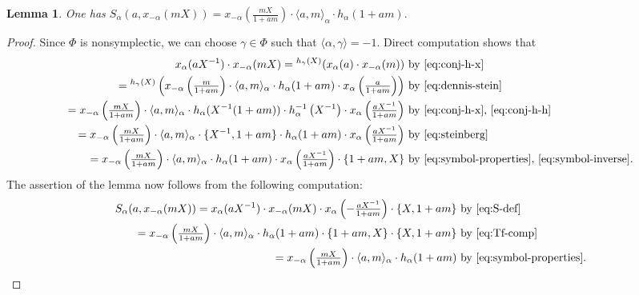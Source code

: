 \documentclass[oneside, 8pt]{amsart}
\newtheorem{lemma}{Lemma}
\theoremstyle{remark}
\theoremstyle{definition}
\numberwithin{lemma}{section}
\numberwithin{prop}{section}
\numberwithin{corollary}{section}
\numberwithin{externaltheorem}{section}
\numberwithin{equation}{section}
\begin{document}
\begin{lemma} \label{lem:Tulenbaev-formula} 
One has $S_\alpha(a, x_{-\alpha}(mX)) = x_{-\alpha}\left(\tfrac{mX}{1+am}\right) \cdot \langle a, m\rangle_\alpha \cdot h_\alpha(1+am).$
\end{lemma}
\begin{proof} Since $\Phi$ is nonsymplectic, we can choose $\gamma \in \Phi$ such that $\langle \alpha, \gamma \rangle = -1$. Direct computation shows that
 \begin{align} 
 x_\alpha(aX^{-1}) \cdot x_{-\alpha}(mX) = {}^{h_\gamma(X)}(x_\alpha(a) \cdot x_{-\alpha}(m)) &\text{ by~\eqref{eq:conj-h-x}} \label{eq:Tf-comp} \\
 = {}^{h_\gamma(X)}\left( x_{-\alpha}\left(\tfrac{m}{1+am}\right) \cdot \langle a, m\rangle_\alpha \cdot h_\alpha(1+am) \cdot x_\alpha\left(\tfrac{a}{1+am}\right) \right) &\text{ by~\eqref{eq:dennis-stein}} \nonumber \\
 = x_{-\alpha}\left(\tfrac{mX}{1+am}\right) \cdot \langle a, m\rangle_\alpha \cdot h_\alpha(X^{-1}(1+am))\cdot h_\alpha^{-1}\left(X^{-1}\right) \cdot x_{\alpha}\left(\tfrac{aX^{-1}}{1+am}\right) &\text{ by~\eqref{eq:conj-h-x}, \eqref{eq:conj-h-h}} \nonumber \\
 = x_{-\alpha}\left(\tfrac{mX}{1+am}\right) \cdot \langle a, m\rangle_\alpha \cdot \{X^{-1}, 1+am\} \cdot h_\alpha(1+am)\cdot x_{\alpha}\left(\tfrac{aX^{-1}}{1+am}\right)&\text{ by~\eqref{eq:steinberg}} \nonumber \\
 = x_{-\alpha}\left(\tfrac{mX}{1+am}\right) \cdot \langle a, m\rangle_\alpha \cdot h_\alpha(1+am) \cdot x_{\alpha}\left(\tfrac{aX^{-1}}{1+am}\right) \cdot \{1+am, X\}&\text{ by~\eqref{eq:symbol-properties}, \eqref{eq:symbol-inverse}}. \nonumber \end{align}
The assertion of the lemma now follows from the following computation:
\begin{align*}
 S_\alpha(a, x_{-\alpha}(mX)) = x_\alpha(aX^{-1})\cdot x_{-\alpha}(mX) \cdot x_\alpha\left(-\tfrac{aX^{-1}}{1 + am}\right) \cdot \{X, 1+ am\} &\text{ by~\eqref{eq:S-def}} \\
 = x_{-\alpha}\left(\tfrac{mX}{1+am}\right) \cdot \langle a, m\rangle_\alpha \cdot h_\alpha(1+am) \cdot \{1+am, X\} \cdot \{X, 1+ am\}&\text{ by~\eqref{eq:Tf-comp}} \\
 = x_{-\alpha}\left(\tfrac{mX}{1+am}\right) \cdot \langle a, m\rangle_\alpha \cdot h_\alpha(1+am) &\text{ by~\eqref{eq:symbol-properties}}. \qedhere\end{align*} \end{proof}
\end{document}
